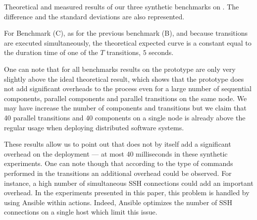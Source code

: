 \begin{table}
	\begin{center}
		
		\caption{Theoretical and measured results of our three synthetic benchmarks on \ecotype. The difference and the standard deviations are also represented.}
		\label{tab:resultssynt}
	\end{center}
\end{table}

For Benchmark (C), as for the previous benchmark (B), and because transitions are executed simultaneously, the theoretical expected curve is a constant equal to the duration time of one of the $T$ transitions, \ie $5$ seconds. 

One can note that for all benchmarks results on the \mad prototype are only very slightly above the ideal theoretical result, which shows that the prototype does not add significant overheads to the process even for a large number of sequential components, parallel components and parallel transitions on the same node.  We may have increase the number of components and transitions but we claim that 40 parallel transitions and 40 components on a single node is already above the regular usage when deploying distributed software systems.


These results allow us to point out that \mad does not by itself add a significant overhead on the deployment --- at most 40 milliseconds in these synthetic experiments. One can note though that according to the type of commands performed in the transitions  an additional overhead could be observed. For instance, a high number of simultaneous SSH connections could add an important overhead. In the experiments presented in this paper, this problem is handled by using Ansible within actions. Indeed, Ansible optimizes the number of SSH connections on a single host which limit this issue.


